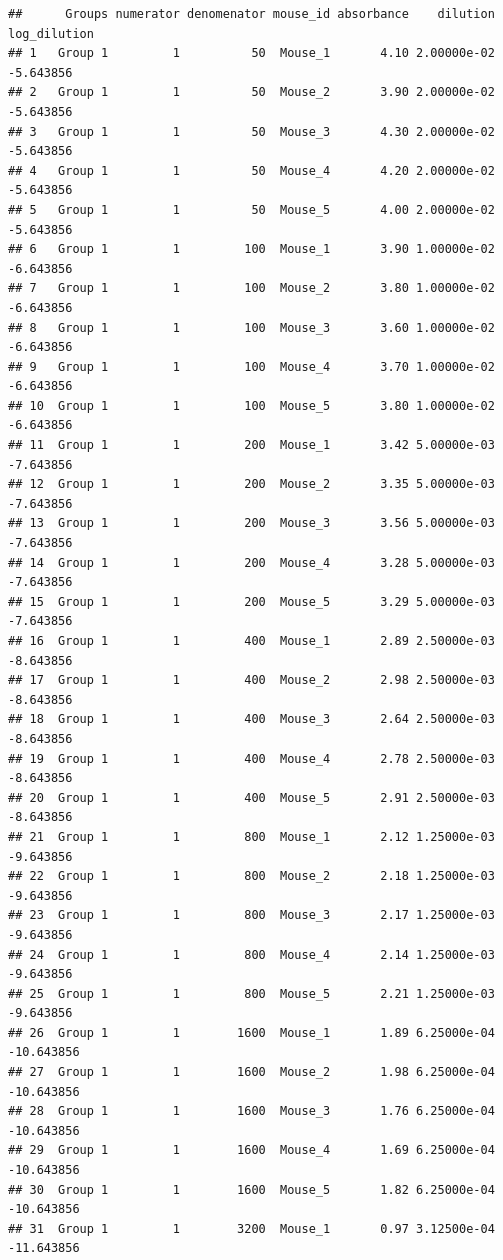 \documentclass[
]{book}
\begin{document}
\begin{verbatim}
##      Groups numerator denomenator mouse_id absorbance    dilution log_dilution
## 1   Group 1         1          50  Mouse_1       4.10 2.00000e-02    -5.643856
## 2   Group 1         1          50  Mouse_2       3.90 2.00000e-02    -5.643856
## 3   Group 1         1          50  Mouse_3       4.30 2.00000e-02    -5.643856
## 4   Group 1         1          50  Mouse_4       4.20 2.00000e-02    -5.643856
## 5   Group 1         1          50  Mouse_5       4.00 2.00000e-02    -5.643856
## 6   Group 1         1         100  Mouse_1       3.90 1.00000e-02    -6.643856
## 7   Group 1         1         100  Mouse_2       3.80 1.00000e-02    -6.643856
## 8   Group 1         1         100  Mouse_3       3.60 1.00000e-02    -6.643856
## 9   Group 1         1         100  Mouse_4       3.70 1.00000e-02    -6.643856
## 10  Group 1         1         100  Mouse_5       3.80 1.00000e-02    -6.643856
## 11  Group 1         1         200  Mouse_1       3.42 5.00000e-03    -7.643856
## 12  Group 1         1         200  Mouse_2       3.35 5.00000e-03    -7.643856
## 13  Group 1         1         200  Mouse_3       3.56 5.00000e-03    -7.643856
## 14  Group 1         1         200  Mouse_4       3.28 5.00000e-03    -7.643856
## 15  Group 1         1         200  Mouse_5       3.29 5.00000e-03    -7.643856
## 16  Group 1         1         400  Mouse_1       2.89 2.50000e-03    -8.643856
## 17  Group 1         1         400  Mouse_2       2.98 2.50000e-03    -8.643856
## 18  Group 1         1         400  Mouse_3       2.64 2.50000e-03    -8.643856
## 19  Group 1         1         400  Mouse_4       2.78 2.50000e-03    -8.643856
## 20  Group 1         1         400  Mouse_5       2.91 2.50000e-03    -8.643856
## 21  Group 1         1         800  Mouse_1       2.12 1.25000e-03    -9.643856
## 22  Group 1         1         800  Mouse_2       2.18 1.25000e-03    -9.643856
## 23  Group 1         1         800  Mouse_3       2.17 1.25000e-03    -9.643856
## 24  Group 1         1         800  Mouse_4       2.14 1.25000e-03    -9.643856
## 25  Group 1         1         800  Mouse_5       2.21 1.25000e-03    -9.643856
## 26  Group 1         1        1600  Mouse_1       1.89 6.25000e-04   -10.643856
## 27  Group 1         1        1600  Mouse_2       1.98 6.25000e-04   -10.643856
## 28  Group 1         1        1600  Mouse_3       1.76 6.25000e-04   -10.643856
## 29  Group 1         1        1600  Mouse_4       1.69 6.25000e-04   -10.643856
## 30  Group 1         1        1600  Mouse_5       1.82 6.25000e-04   -10.643856
## 31  Group 1         1        3200  Mouse_1       0.97 3.12500e-04   -11.643856

\end{verbatim}
\end{document}
